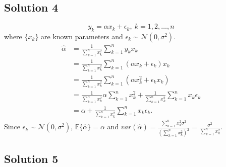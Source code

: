 \documentclass[a4paper,english,12pt]{article}
\begin{document}
\hypertarget{solution4}{\subsection*{Solution 4}}
\begin{equation*}
y_k=\alpha x_k+\epsilon_k, \ k = 1,2,\dots,n
\end{equation*}
where $\{x_k\}$ are known parameters and $\epsilon_k \sim \mathcal{N}(0,\sigma^2)$.
\begin{align*}
\hat{\alpha }&=\frac{1}{\sum\limits_{k=1}^{n}x_{k}^2}\sum\limits_{k=1}^{n}y_{k}x_{k}\\
  &=\frac{1}{\sum\limits_{k=1}^{n}x_{k}^2}\sum\limits_{k=1}^{n}(\alpha x_{k}+\epsilon_{k})x_{k}\\
  &=\frac{1}{\sum\limits_{k=1}^{n}x_{k}^2}\sum\limits_{k=1}^{n}(\alpha x_{k}^2+\epsilon_{k} x_{k})\\
  &=\frac{1}{\sum\limits_{k=1}^{n} x_{k}^2}\alpha\sum_{k=1}^nx_k^2+\frac{1}{\sum\limits_{k=1}^{n} x_{k}^2}\sum_{k=1}^n x_k\epsilon_k\\
  &=\alpha+\frac{1}{\sum\limits_{k=1}^{n} x_{k}^2}\sum_{k=1}^n x_k\epsilon_k.
\end{align*}
Since $\epsilon_k \sim \mathcal{N}(0,\sigma^2)$, $\mathbb{E}\{\hat{\alpha}\}=\alpha$ and $var(\hat{\alpha})=\frac{\sum_{k=1}^nx_k^2\sigma^2}{\left(\sum_{k=1}^nx_k^2\right)^2}=\frac{\sigma^2}{\sum_{k=1}^nx_k^2}$.
\hypertarget{solution5}{\subsection*{Solution 5}}
\end{document}
